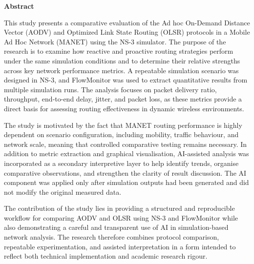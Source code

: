 \small
\noindent\textbf{Abstract}

This study presents a comparative evaluation of the Ad hoc On-Demand Distance Vector (AODV) and Optimized Link State Routing (OLSR) protocols in a Mobile Ad Hoc Network (MANET) using the NS-3 simulator. The purpose of the research is to examine how reactive and proactive routing strategies perform under the same simulation conditions and to determine their relative strengths across key network performance metrics. A repeatable simulation scenario was designed in NS-3, and FlowMonitor was used to extract quantitative results from multiple simulation runs. The analysis focuses on packet delivery ratio, throughput, end-to-end delay, jitter, and packet loss, as these metrics provide a direct basis for assessing routing effectiveness in dynamic wireless environments.

The study is motivated by the fact that MANET routing performance is highly dependent on scenario configuration, including mobility, traffic behaviour, and network scale, meaning that controlled comparative testing remains necessary. In addition to metric extraction and graphical visualisation, AI-assisted analysis was incorporated as a secondary interpretive layer to help identify trends, organise comparative observations, and strengthen the clarity of result discussion. The AI component was applied only after simulation outputs had been generated and did not modify the original measured data.

The contribution of the study lies in providing a structured and reproducible workflow for comparing AODV and OLSR using NS-3 and FlowMonitor while also demonstrating a careful and transparent use of AI in simulation-based network analysis. The research therefore combines protocol comparison, repeatable experimentation, and assisted interpretation in a form intended to reflect both technical implementation and academic research rigour.
